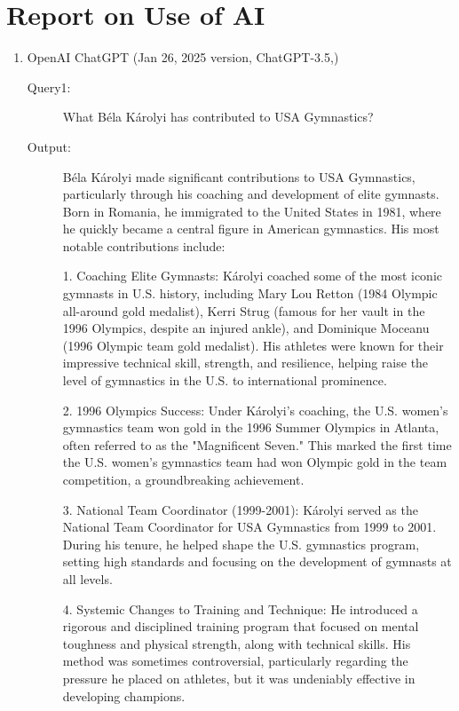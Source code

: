 \documentclass{mcmthesis}
\begin{document}
	
	
\newpage
{}
\setcounter{lastpage}{\value{page}}
\thispagestyle{empty} 

\section*{Report on Use of AI}

\begin{enumerate}
	\item OpenAI ChatGPT (Jan 26, 2025 version, ChatGPT-3.5,) 
	\begin{description}
		\item[Query1:] What Béla Károlyi has contributed to USA Gymnastics?
		\item[Output:] Béla Károlyi made significant contributions to USA Gymnastics, particularly through his coaching and development of elite gymnasts. Born in Romania, he immigrated to the United States in 1981, where he quickly became a central figure in American gymnastics. His most notable contributions include:
		
		1. Coaching Elite Gymnasts:
		Károlyi coached some of the most iconic gymnasts in U.S. history, including Mary Lou Retton (1984 Olympic all-around gold medalist), Kerri Strug (famous for her vault in the 1996 Olympics, despite an injured ankle), and Dominique Moceanu (1996 Olympic team gold medalist). His athletes were known for their impressive technical skill, strength, and resilience, helping raise the level of gymnastics in the U.S. to international prominence.
		
		2. 1996 Olympics Success:
		Under Károlyi's coaching, the U.S. women’s gymnastics team won gold in the 1996 Summer Olympics in Atlanta, often referred to as the "Magnificent Seven." This marked the first time the U.S. women's gymnastics team had won Olympic gold in the team competition, a groundbreaking achievement.
		
		3. National Team Coordinator (1999-2001):
		Károlyi served as the National Team Coordinator for USA Gymnastics from 1999 to 2001. During his tenure, he helped shape the U.S. gymnastics program, setting high standards and focusing on the development of gymnasts at all levels.
		
		4. Systemic Changes to Training and Technique:
		He introduced a rigorous and disciplined training program that focused on mental toughness and physical strength, along with technical skills. His method was sometimes controversial, particularly regarding the pressure he placed on athletes, but it was undeniably effective in developing champions.
		

\end{description}
\end{enumerate}
\end{document}
